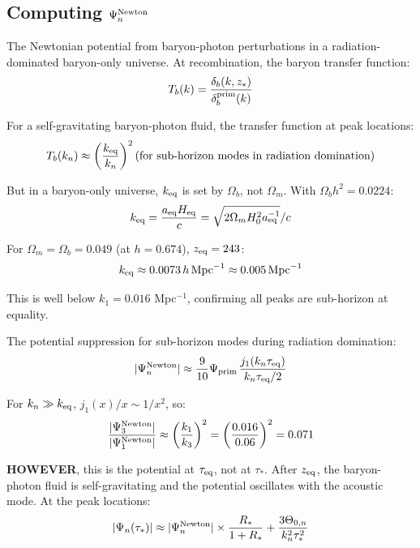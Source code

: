 \documentclass[11pt,a4paper]{article}
\begin{document}
\subsection{Computing $\Psi_n^{\rm Newton}$}

The Newtonian potential from baryon-photon perturbations in a radiation-dominated baryon-only universe. At recombination, the baryon transfer function:
\begin{equation}
T_b(k) = \frac{\delta_b(k, z_*)}{\delta_b^{\rm prim}(k)}
\end{equation}

For a self-gravitating baryon-photon fluid, the transfer function at peak locations:
\begin{equation}
T_b(k_n) \approx \left(\frac{k_{\rm eq}}{k_n}\right)^2 \text{(for sub-horizon modes in radiation domination)}
\end{equation}

But in a baryon-only universe, $k_{\rm eq}$ is set by $\Omega_b$, not $\Omega_m$. With $\Omega_b h^2 = 0.0224$:
\begin{equation}
k_{\rm eq} = \frac{a_{\rm eq}H_{\rm eq}}{c} = \sqrt{2\Omega_m H_0^2 a_{\rm eq}^{-1}}/c
\end{equation}

For $\Omega_m = \Omega_b = 0.049$ (at $h = 0.674$), $z_{\rm eq} = 243$:
\begin{equation}
k_{\rm eq} \approx 0.0073\,h\,{\rm Mpc}^{-1} \approx 0.005\,{\rm Mpc}^{-1}
\end{equation}

This is well below $k_1 = 0.016$ Mpc$^{-1}$, confirming all peaks are sub-horizon at equality.

The potential suppression for sub-horizon modes during radiation domination:
\begin{equation}
|\Psi_n^{\rm Newton}| \approx \frac{9}{10}\Psi_{\rm prim}\,\frac{j_1(k_n\tau_{\rm eq})}{k_n\tau_{\rm eq}/2}
\end{equation}

For $k_n \gg k_{\rm eq}$, $j_1(x)/x \sim 1/x^2$, so:
\begin{equation}
\frac{|\Psi_3^{\rm Newton}|}{|\Psi_1^{\rm Newton}|} \approx \left(\frac{k_1}{k_3}\right)^2 = \left(\frac{0.016}{0.06}\right)^2 = 0.071
\end{equation}

\textbf{HOWEVER}, this is the potential at $\tau_{\rm eq}$, not at $\tau_*$. After $z_{\rm eq}$, the baryon-photon fluid is self-gravitating and the potential oscillates with the acoustic mode. At the peak locations:
\begin{equation}
|\Psi_n(\tau_*)| \approx |\Psi_n^{\rm Newton}| \times \frac{R_*}{1+R_*} + \frac{3\Theta_{0,n}}{k_n^2\tau_*^2}
\end{equation}
\end{document}
